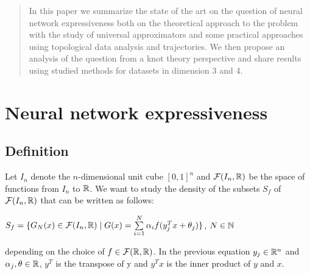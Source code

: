 \documentclass[12pt, a4paper]{article}
\begin{document}
\newpage
\maketitle
\begin{abstract}
  In this paper we summarize the state of the art on the question of neural network expressiveness both on the theoretical approach to the problem with the study of universal approximators and some practical approaches using topological data analysis and trajectories. We then propose an analysis of the question from a knot theory perspective and share results using studied methods for datasets in dimension 3 and 4.
\end{abstract}

\newpage

\setcounter{page}{0}
\setcounter{page}{1}

\tableofcontents

\newpage

\listoffigures

\newpage

\listoftables

\newpage

\thispagestyle{empty}
\mbox{}
\newpage

\setcounter{page}{0}
\setcounter{page}{1}

\section{Neural network expressiveness}

\subsection{Definition}

Let $I_n$ denote the $n$-dimensional unit cube $[0,1]^n$ and $\mathcal{F}(I_n,\mathbb{R})$ be the space of functions from $I_n$ to $\mathbb{R}$. We want to study the density of the subsets $S_f$ of $\mathcal{F}(I_n,\mathbb{R})$ that can be written as follows:\\

\begin{center}
  $S_f = \{G_N(x) \in \mathcal{F}(I_n,\mathbb{R}) \mid G(x) = \sum\limits_{i=1}^{N} \alpha_i f(y_j^T x + \theta_j )\}$, $N \in \mathbb{N} $
\end{center}

depending on the choice of $f \in \mathcal{F}(\mathbb{R},\mathbb{R})$. In the previous equation $y_j \in \mathbb{R}^n$ and $\alpha_j, \theta \in \mathbb{R}$, $y^T$ is the transpose of y and $y^Tx$ is the inner product of $y$ and $x$.\\
\end{document}
